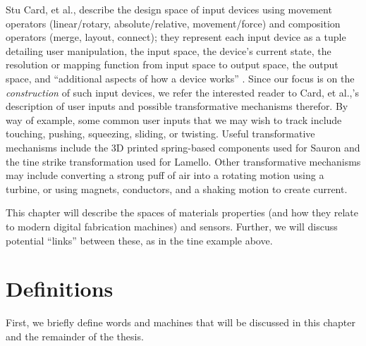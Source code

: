 Stu Card, et al., describe the design space of input devices using movement operators (linear/rotary, absolute/relative, movement/force) and composition operators (merge, layout, connect); they represent each input device as a tuple detailing user manipulation, the input space, the device's current state, the resolution or mapping function from input space to output space, the output space, and ``additional aspects of how a device works'' \cite{card-input}. Since our focus is on the \emph{construction} of such input devices, we refer the interested reader to Card, et al.,'s description of user inputs and possible transformative mechanisms therefor. By way of example, some common user inputs that we may wish to track include touching, pushing, squeezing, sliding, or twisting. Useful transformative mechanisms include the 3D printed spring-based components used for Sauron and the tine strike transformation used for Lamello. Other transformative mechanisms may include converting a strong puff of air into a rotating motion using a turbine, or using magnets, conductors, and a shaking motion to create current.

This chapter will describe the spaces of materials properties (and how they relate to modern digital fabrication machines) and sensors. Further, we will discuss potential ``links'' between these, as in the tine example above.

\section{Definitions}

First, we briefly define words and machines that will be discussed in this chapter and the remainder of the thesis.


